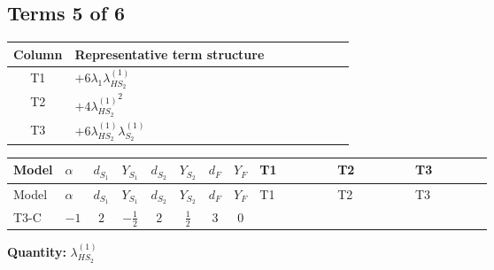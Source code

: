 \documentclass[8pt]{article}
\begin{document}
\begin{landscape}
\subsection*{Terms 5 of 6}
\begin{center}
\begin{tabular}{@{}c >{\raggedright\arraybackslash}p{0.82\linewidth}@{}}
\toprule
Column & Representative term structure \\
\midrule
T1 & \(\displaystyle +6 {\lambda_1} {\lambda_{HS_2}^{(1)}}\) \\
\midrule
T2 & \(\displaystyle +4 {\lambda_{HS_2}^{(1)}}^2\) \\
\midrule
T3 & \(\displaystyle +6 {\lambda_{HS_2}^{(1)}} {\lambda_{S_2}^{(1)}}\) \\
\midrule
\bottomrule
\end{tabular}
\end{center}
\smallskip
\tiny
\begin{longtable}{@{}llcccccc >{\raggedright\arraybackslash}p{0.21\linewidth} >{\raggedright\arraybackslash}p{0.21\linewidth} >{\raggedright\arraybackslash}p{0.21\linewidth}@{}}
\toprule
Model & $\alpha$ & $d_{S_1}$ & $Y_{S_1}$ & $d_{S_2}$ & $Y_{S_2}$ & $d_F$ & $Y_F$ & T1 & T2 & T3 \\
\midrule
\endfirsthead
\toprule
Model & $\alpha$ & $d_{S_1}$ & $Y_{S_1}$ & $d_{S_2}$ & $Y_{S_2}$ & $d_F$ & $Y_F$ & T1 & T2 & T3 \\
\midrule
\endhead
T3-C & $-1$ & $2$ & $-\frac{1}{2}$ & $2$ & $\frac{1}{2}$ & $3$ & $0$ & \scriptsize\adjustbox{max width=\linewidth}{$\begin{gathered} +6 {\lambda_1} {\lambda_{HS_2}^{(1)}}\end{gathered}$} & \scriptsize\adjustbox{max width=\linewidth}{$\begin{gathered} +4 {\lambda_{HS_2}^{(1)}}^2\end{gathered}$} & \scriptsize\adjustbox{max width=\linewidth}{$\begin{gathered} +6 {\lambda_{HS_2}^{(1)}} {\lambda_{S_2}^{(1)}}\end{gathered}$} \\
\midrule
\bottomrule
\end{longtable}
\clearpage
\noindent\textbf{Quantity: }$\lambda_{HS_2}^{(1)}$\par\smallskip

\end{landscape}
\end{document}
